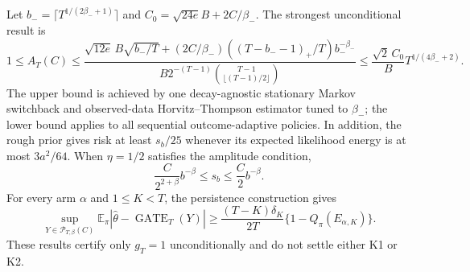 Let \(b_-=\lceil T^{1/(2\beta_-+1)}\rceil\) and \(C_0=\sqrt{24e}B+2C/\beta_-\). The strongest unconditional result is
\[
1\le A_T(C)\le
\frac{\sqrt{12e}\,B\sqrt{b_-/T}+(2C/\beta_-)((T-b_--1)_+/T)b_-^{-\beta_-}}
{B2^{-(T-1)}\binom{T-1}{\lfloor(T-1)/2\rfloor}}
\le \frac{\sqrt2\,C_0}{B}T^{1/(4\beta_-+2)}.
\]
The upper bound is achieved by one decay-agnostic stationary Markov switchback and observed-data Horvitz--Thompson estimator tuned to \(\beta_-\); the lower bound applies to all sequential outcome-adaptive policies. In addition, the rough prior gives risk at least \(s_b/25\) whenever its expected likelihood energy is at most \(3a^2/64\). When \(\eta=1/2\) satisfies the amplitude condition,
\[
\frac{C}{2^{2+\beta}}b^{-\beta}\le s_b\le\frac C2b^{-\beta}.
\]
For every arm \(\alpha\) and \(1\le K<T\), the persistence construction gives
\[
\sup_{Y\in\mathcal P_{T,\beta}(C)}\mathbb E_\pi
\left|\widehat\theta-\operatorname{GATE}_T(Y)\right|
\ge
\frac{(T-K)\delta_K}{2T}\{1-Q_\pi(E_{\alpha,K})\}.
\]
These results certify only \(g_T=1\) unconditionally and do not settle either K1 or K2.